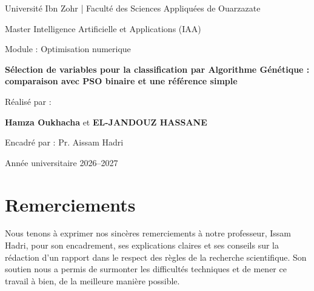 \documentclass[11pt,a4paper]{report}
\begin{document}
\begin{titlepage}
\centering
{\large Université Ibn Zohr | Faculté des Sciences Appliquées de Ouarzazate\par}
{\large Master Intelligence Artificielle et Applications (IAA)\par}
\vspace{0.5cm}
{Module : {Optimisation numerique}\par}
\vspace{3cm}
{\LARGE\bfseries Sélection de variables pour la classification par Algorithme Génétique :\\[0.3cm]
comparaison avec PSO binaire et une référence simple\par}
\vspace{2.5cm}
{\large Réalisé par :\par}
\vspace{0.2cm}
{\large \textbf{Hamza Oukhacha} \quad et \quad \textbf{EL-JANDOUZ HASSANE}\par}
\vspace{0.4cm}
{\large Encadré par : {Pr. Aissam Hadri}\par}
\vfill
{\large Année universitaire 2026--2027\par}
\end{titlepage}


\chapter*{Remerciements}
Nous tenons à exprimer nos sincères remerciements à notre professeur, Issam Hadri, pour son encadrement, ses explications claires et ses conseils sur la rédaction d'un rapport dans le respect des règles de la recherche scientifique. Son soutien nous a permis de surmonter les difficultés techniques et de mener ce travail à bien, de la meilleure manière possible.

\end{document}
